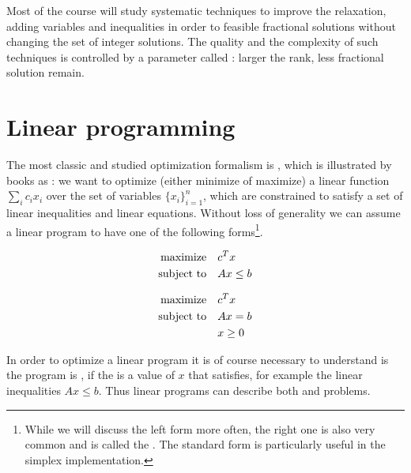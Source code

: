 \documentclass[a4paper,twoside,justified]{tufte-handout}
\begin{document}
Most of the course will study systematic techniques to improve the
relaxation, adding variables and inequalities in order to
 feasible fractional solutions without changing
the set of integer solutions. The quality and the complexity of such
techniques is controlled by a parameter called :
larger the rank, less fractional solution remain.

\section{Linear programming}

The most classic and studied optimization formalism is
, which is illustrated by books as
\cite{matousek2007understanding}: we want to optimize (either minimize
of maximize) a linear function $ \sum_{i} c_{i}x_{i} $ over the set of
variables $ \{x_{i}\}^{n}_{i=1} $, which are constrained to satisfy a
set of linear inequalities and linear equations. Without loss of
generality we can assume a linear program to have one of the following
forms\footnote{While we will discuss the left form more often, the
  right one is also very common and is called the
  . The standard form is particularly
  useful in the simplex implementation.}.

\begin{figure}
\begin{minipage}[t]{0.5\textwidth}
\begin{alignat*}{2}
  \text{maximize}\hspace{1em}& c^{T}x\\
  \text{subject to}\hspace{1em}& Ax \leq b
\end{alignat*}
\end{minipage}
\begin{minipage}[t]{0.5\textwidth}
\begin{alignat}{2}\label{eq:lpforms}
  \maximize c^{T}x \notag\\
  \subjectto Ax = b\\
  & x \geq 0\notag
\end{alignat}
\end{minipage}
\end{figure}


In order to optimize a linear program it is of course necessary to
understand is the program is , \ie if the is a
value of $ x $ that satisfies, for example the linear inequalities $Ax
\leq b$. Thus linear programs can describe both  and
 problems.
\end{document}
